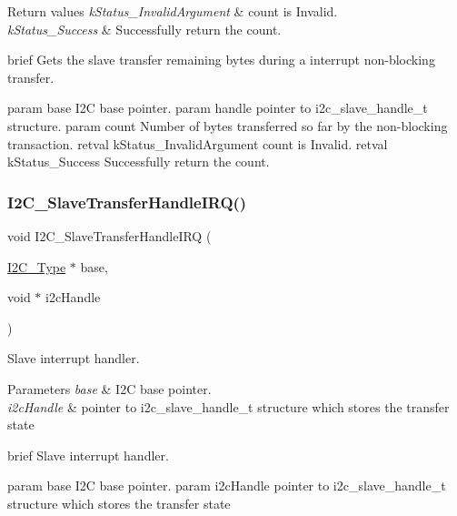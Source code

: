 \begin{DoxyRetVals}{Return values}
{\em k\+Status\+\_\+\+Invalid\+Argument} & count is Invalid. \\
\hline
{\em k\+Status\+\_\+\+Success} & Successfully return the count.\\
\hline
\end{DoxyRetVals}
brief Gets the slave transfer remaining bytes during a interrupt non-\/blocking transfer.

param base I2C base pointer. param handle pointer to i2c\+\_\+slave\+\_\+handle\+\_\+t structure. param count Number of bytes transferred so far by the non-\/blocking transaction. retval k\+Status\+\_\+\+Invalid\+Argument count is Invalid. retval k\+Status\+\_\+\+Success Successfully return the count. \mbox{\label{group__i2c__driver_ga097c0b20503381de44cccba311dcf236}} 
\subsubsection{\texorpdfstring{I2C\_SlaveTransferHandleIRQ()}{I2C\_SlaveTransferHandleIRQ()}}
{\footnotesize\ttfamily void I2\+C\+\_\+\+Slave\+Transfer\+Handle\+I\+RQ (\begin{DoxyParamCaption}\item[{\mbox{\hyperlink{struct_i2_c___type}{I2\+C\+\_\+\+Type}} $\ast$}]{base,  }\item[{void $\ast$}]{i2c\+Handle }\end{DoxyParamCaption})}



Slave interrupt handler. 


\begin{DoxyParams}{Parameters}
{\em base} & I2C base pointer. \\
\hline
{\em i2c\+Handle} & pointer to i2c\+\_\+slave\+\_\+handle\+\_\+t structure which stores the transfer state\\
\hline
\end{DoxyParams}
brief Slave interrupt handler.

param base I2C base pointer. param i2c\+Handle pointer to i2c\+\_\+slave\+\_\+handle\+\_\+t structure which stores the transfer state \mbox{\label{group__i2c__driver_gaa387d81ea08a9d4b39cfeb3dfec505f7}} 
